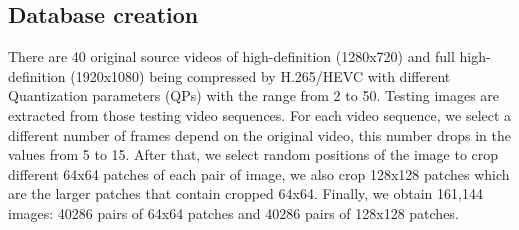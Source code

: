 \subsection{Database creation}

There are 40 original source videos of high-definition (1280x720) and full high-definition (1920x1080) being compressed by H.265/HEVC with different Quantization parameters (QPs) with the range from 2 to 50. Testing images are extracted from those testing video sequences. For each video sequence, we select a different number of frames depend on the original video, this number drops in the values from 5 to 15. After that, we select random positions of the image to crop different 64x64 patches of each pair of image, we also crop 128x128 patches which are the larger patches that contain cropped 64x64. Finally, we obtain 161,144 images: 40286 pairs of 64x64 patches and 40286 pairs of 128x128 patches.



